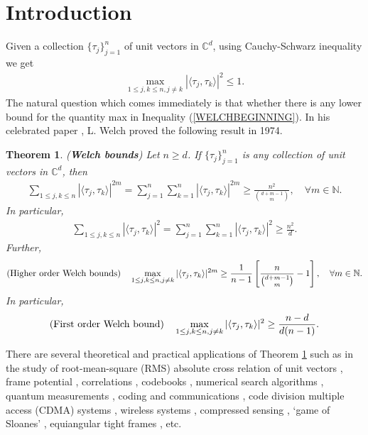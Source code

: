 \documentclass{amsart}
\newtheorem{theorem}{Theorem}[section]
\begin{document}
\section{Introduction}
Given a collection $\{\tau_j\}_{j=1}^n$ of  unit vectors in $\mathbb{C}^d$, using Cauchy-Schwarz inequality we get 
\begin{align}\label{WELCHBEGINNING}
\max _{1\leq j,k \leq n, j\neq k}|\langle \tau_j, \tau_k\rangle |^{2}\leq 1.
\end{align}
The natural question which comes immediately is that whether there is any lower bound for the quantity max in Inequality (\ref{WELCHBEGINNING}). In his celebrated paper \cite{WELCH}, L. Welch proved the following result in 1974.
  \begin{theorem}\cite{WELCH}\label{WELCHTHEOREM} (\textbf{Welch bounds})
	Let $n\geq d$.	If	$\{\tau_j\}_{j=1}^n$  is any collection of  unit vectors in $\mathbb{C}^d$, then
	\begin{align*}
		\sum_{1\leq j,k \leq n}|\langle \tau_j, \tau_k\rangle |^{2m}=\sum_{j=1}^n\sum_{k=1}^n|\langle \tau_j, \tau_k\rangle |^{2m}\geq \frac{n^2}{{d+m-1\choose m}}, \quad \forall m \in \mathbb{N}.
	\end{align*}
	In particular,
	\begin{align*}
	\sum_{1\leq j,k \leq n}|\langle \tau_j, \tau_k\rangle |^{2}=		\sum_{j=1}^n\sum_{k=1}^n|\langle \tau_j, \tau_k\rangle |^{2}\geq \frac{n^2}{{d}}.
	\end{align*}
	Further, 
	\begin{align*}
		\text{(\textbf{Higher order Welch bounds})}	\quad		\max _{1\leq j,k \leq n, j\neq k}|\langle \tau_j, \tau_k\rangle |^{2m}\geq \frac{1}{n-1}\left[\frac{n}{{d+m-1\choose m}}-1\right], \quad \forall m \in \mathbb{N}.
	\end{align*}
	In particular,
	\begin{align*}
		\text{(\textbf{First order Welch bound})}\quad 	\max _{1\leq j,k \leq n, j\neq k}|\langle \tau_j, \tau_k\rangle |^{2}\geq\frac{n-d}{d(n-1)}.
	\end{align*}
\end{theorem}
 There are several theoretical and practical applications of Theorem \ref{WELCHTHEOREM} such as in the study of root-mean-square (RMS) absolute cross relation of unit vectors   \cite{SARWATEMEETING}, frame potential \cite{BENEDETTOFICKUS, CASAZZAFICKUSOTHERS, BODMANNHAASPOTENTIAL}, 
 correlations \cite{SARWATE},  codebooks \cite{DINGFENG}, numerical search algorithms  \cite{XIA, XIACORRECTION}, quantum measurements 
\cite{SCOTTTIGHT}, coding and communications \cite{TROPPDHILLON, STROHMERHEATH}, code division multiple access (CDMA) systems \cite{CHEBIRA1, CHEBIRA2}, wireless systems \cite{YATES}, compressed sensing \cite{TAN}, `game of Sloanes' \cite{JASPERKINGMIXON}, equiangular tight frames \cite{SUSTIKTROPP},  etc.
\end{document}

